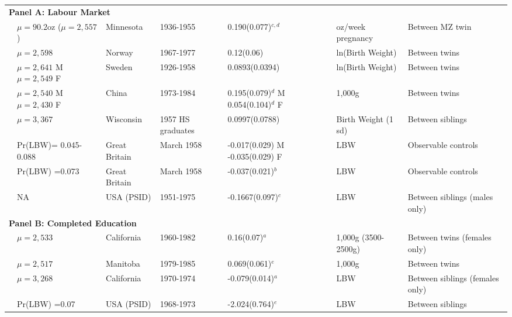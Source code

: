 \documentclass[a4paper, 11pt]{article}
\begin{document}
\begin{landscape}
\begin{longtable}{p{5.5cm}p{2.2cm}p{2cm}p{2cm}p{2.7cm}p{2cm}p{3.4cm}}
    \multicolumn{7}{l}{\textbf{Panel A: Labour Market}} \\
    \citet{BehrmanRosenzweig2004} &$\mu=90.2$oz ($\mu=2,557$)&Minnesota&1936-1955&0.190(0.077)$^{c,d}$&oz/week pregnancy&Between MZ twin\\
    \citet{Blacketal2007} &$\mu=2,598$&Norway&1967-1977&0.12(0.06)&ln(Birth Weight)&Between twins\\
    \citet{Bharadwajetal2015} &$\mu=2,641$ M $\mu=2,549$ F&Sweden&1926-1958&0.0893(0.0394)&ln(Birth Weight)&Between twins\\
    \citet{RosenzweigZhang2013}&$\mu=2,540$ M $\mu=2,430$ F&China&1973-1984&0.195(0.079)$^{d}$ M 0.054(0.104)$^{d}$ F&1,000g&Between twins\\
    \citet{CookFletcher2015} & $\mu=3,367$&Wisconsin&1957 HS graduates&0.0997(0.0788)&Birth Weight (1 sd)&Between siblings\\
    \citet{CurrieHyson1999} &Pr(LBW)= 0.045-0.088&Great Britain & March 1958 &-0.017(0.029) M -0.035(0.029) F& LBW&Observable controls\\
    \citet{Caseetal2005} &Pr(LBW) =0.073 & Great Britain & March 1958 & -0.037(0.021)$^{b}$& LBW & Observable controls \\
    \citet{JohnsonSchoeni2011} &NA&USA (PSID)&1951-1975&-0.1667(0.097)$^{c}$&LBW&Between siblings (males only) \\
    \multicolumn{7}{l}{\textbf{Panel B: Completed Education}}\\
    \citet{Royer2009}&$\mu=2,533$&California&1960-1982&0.16(0.07)$^{a}$ &1,000g (3500-2500g)&Between twins (females only)\\
    \citet{Oreopoulosetal2008} &$\mu=2,517$&Manitoba&1979-1985&0.069(0.061)$^{e}$&1,000g&Between twins\\
    \citet{CurrieMoretti2007} &$\mu=3,268$&California&1970-1974&-0.079(0.014)$^{a}$&LBW& Between siblings (females only)\\
    \citet{ConleyBennet2000} &Pr(LBW) =0.07&USA (PSID)&1968-1973&-2.024(0.764)$^{e}$&LBW&Between siblings\\
  \end{longtable}
\end{landscape}


\end{document}

